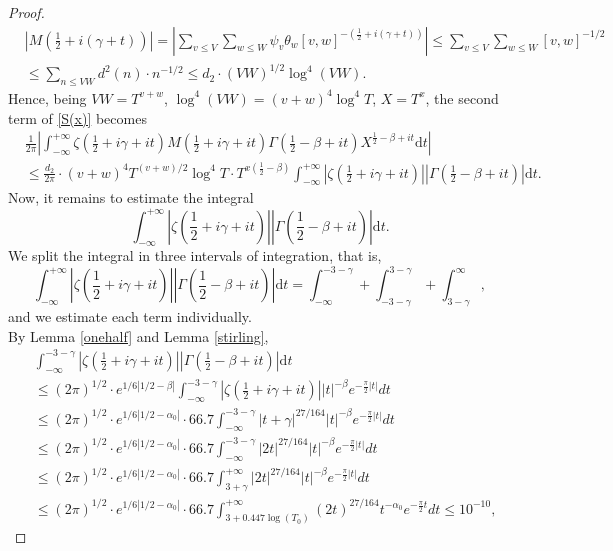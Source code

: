 \documentclass[reqno]{amsart}
\numberwithin{equation}{section}
\theoremstyle{remark}
\begin{document}
\begin{proof}
\begin{equation*}
    \begin{aligned}
        &\left|M\left(\frac{1}{2}+i(\gamma+t)\right)\right|=\left|\sum_{v \leq V} \sum_{w \leq W} \psi_v \theta_w [v, w]^{-(\frac{1}{2}+i(\gamma+t))}\right|\le \sum_{v \leq V} \sum_{w \leq W} [v, w]^{-1/2}\\&\le \sum_{n\le VW}d^{2}(n)\cdot n^{-1/2} \le   d_2\cdot (VW)^{1/2}\log^4(VW).
    \end{aligned}
\end{equation*}
Hence, being $VW=T^{v+w}$, $\log^4(VW)=(v+w)^4\log^4T$, $X=T^x$,  the second term of \eqref{S(x)} becomes
\begin{equation}\label{termsx}
    \begin{aligned}
        & \frac{1}{2\pi}\left|\int_{- \infty}^{+ \infty} \zeta\left(\frac{1}{2}+i\gamma+it\right) M\left(\frac{1}{2}+i\gamma+it\right) \Gamma\left(\frac{1}{2}-\beta+it\right) X^{\frac{1}{2}-\beta+it} \text{d} t\right|\\&\le \frac{ d_2}{2\pi}\cdot (v+w)^4T^{(v+w)/2}\log^4T\cdot T^{x(\frac{1}{2}-\beta)}\int_{- \infty}^{+ \infty} \left|\zeta\left(\frac{1}{2}+i\gamma+it\right)\right|\left| \Gamma\left(\frac{1}{2}-\beta+it\right)\right|\text{d} t.
    \end{aligned}
\end{equation}
Now, it remains to estimate the integral
\[
\int_{- \infty}^{+ \infty} \left|\zeta\left(\frac{1}{2}+i\gamma+it\right)\right|\left| \Gamma\left(\frac{1}{2}-\beta+it\right)\right|\text{d} t.
\]
We split the integral in three intervals of integration, that is,
\[
\int_{- \infty}^{+ \infty} \left|\zeta\left(\frac{1}{2}+i\gamma+it\right)\right|\left| \Gamma\left(\frac{1}{2}-\beta+it\right)\right|\text{d} t=\int_{-\infty}^{-3-\gamma}+\int_{-3-\gamma}^{3-\gamma}+\int_{3-\gamma}^{\infty},
\]
and we estimate each term individually.\\
By Lemma \ref{onehalf} and Lemma \ref{stirling},
\begin{equation}\label{firstint}
    \begin{aligned}
     &\int_{- \infty}^{-3-\gamma} \left|\zeta\left(\frac{1}{2}+i\gamma+it\right)\right|\left| \Gamma\left(\frac{1}{2}-\beta+it\right)\right|\text{d} t\\&\le (2\pi)^{1/2}\cdot e^{1/6|1/2-\beta|} \int_{-\infty}^{-3-\gamma}\left|\zeta\left(\frac{1}{2}+i\gamma+it\right)\right||t|^{-\beta}e^{-\frac{\pi}{2}|t|}dt \\&\le (2\pi)^{1/2}\cdot e^{1/6|1/2-\alpha_0|}\cdot 66.7 \int_{-\infty}^{-3-\gamma}|t+\gamma|^{ 27/164}|t|^{-\beta}e^{-\frac{\pi}{2}|t|}dt\\&\le (2\pi)^{1/2}\cdot e^{1/6|1/2-\alpha_0|}\cdot 66.7 \int_{-\infty}^{-3-\gamma}\left|2t\right|^{ 27/164}|t|^{-\beta}e^{-\frac{\pi}{2}|t|}dt\\&\le (2\pi)^{1/2}\cdot e^{1/6|1/2-\alpha_0|}\cdot 66.7 \int_{3+\gamma}^{+\infty}\left|2t\right|^{ 27/164}|t|^{-\beta}e^{-\frac{\pi}{2}|t|}dt\\&\le (2\pi)^{1/2}\cdot e^{1/6|1/2-\alpha_0|}\cdot 66.7 \int_{3+0.447\log(T_0)}^{+\infty}(2t)^{ 27/164}t^{-\alpha_0}e^{-\frac{\pi}{2}t}dt\le 10^{-10},

\end{aligned}
\end{equation}
\end{proof}
\end{document}
